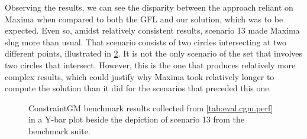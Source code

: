 Observing the results, we can see the disparity between the approach reliant on
Maxima when compared to both the \ac{GFL} and our solution, which was to be
expected.  Even so, amidst relatively consistent results, scenario 13 made
Maxima slug more than usual.  That scenario consists of two circles intersecting
at two different points, illustrated in \cref{fig:eval.cgm.perf.13}.  It is not
the only scenario of the set that involves two circles that intersect.  However,
this is the one that produces relatively more complex results, which could
justify why Maxima took relatively longer to compute the solution than it did
for the scenarios that preceded this one.

\begin{figure}[htb]
  \begin{subfigure}[t]{.75\linewidth}
    \centering
    \label{fig:eval.cgm.perf.plot}
  \end{subfigure}
  \hfill
  \begin{subfigure}[t]{.22\linewidth}
    \centering
    \label{fig:eval.cgm.perf.13}
  \end{subfigure}
  \caption[ConstraintGM benchmarks and Scenario 13]{\label{fig:eval.cgm.perf}%
    ConstraintGM benchmark results collected from \cref{tab:eval.cgm.perf} in a
    Y-bar plot  beside the depiction of scenario
    13  from the benchmark suite.}
\end{figure}

